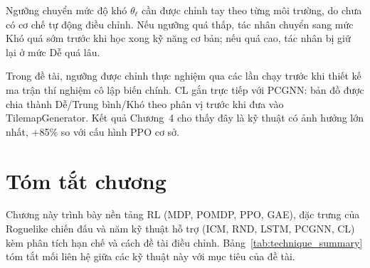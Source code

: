 Ngưỡng chuyển mức độ khó $\theta_\ell$ cần được chỉnh tay theo từng môi trường, do chưa có cơ chế tự động điều chỉnh. Nếu ngưỡng quá thấp, tác nhân chuyển sang mức Khó quá sớm trước khi học xong kỹ năng cơ bản; nếu quá cao, tác nhân bị giữ lại ở mức Dễ quá lâu.

Trong đề tài, ngưỡng được chỉnh thực nghiệm qua các lần chạy trước khi thiết kế ma trận thí nghiệm cô lập biến chính. CL gắn trực tiếp với PCGNN: bản đồ được chia thành Dễ/Trung bình/Khó theo phân vị trước khi đưa vào TilemapGenerator. Kết quả Chương~4 cho thấy đây là kỹ thuật có ảnh hưởng lớn nhất, +85\% so với cấu hình PPO cơ sở.

\section{Tóm tắt chương}

Chương này trình bày nền tảng RL (MDP, POMDP, PPO, GAE), đặc trưng của Roguelike chiến đấu và năm kỹ thuật hỗ trợ (ICM, RND, LSTM, PCGNN, CL) kèm phân tích hạn chế và cách đề tài điều chỉnh. Bảng~\ref{tab:technique_summary} tóm tắt mối liên hệ giữa các kỹ thuật này với mục tiêu của đề tài.

